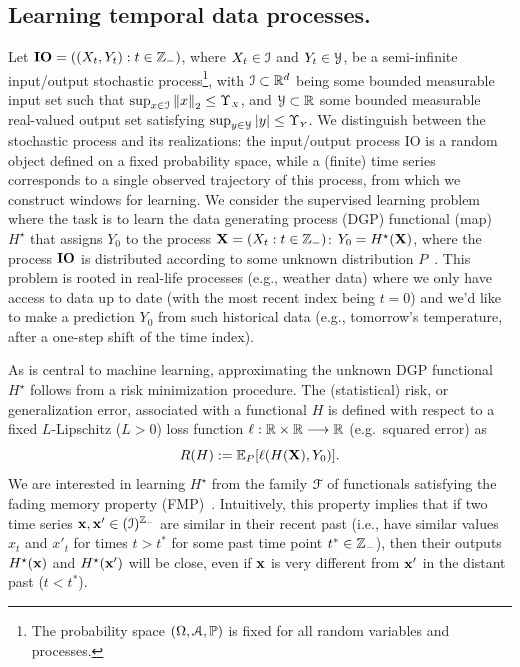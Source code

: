 \subsection{Learning temporal data processes.}\label{subsec:learning-temporal-data}
Let 
$\mathbf{IO} = \left((X_t, Y_t): t \in {\mathbb{Z}}_-\right)$, where $ X_t \in {\mathcal{I}}$ and $Y_t \in {\mathcal{Y}}$, be a semi-infinite input/output stochastic process\footnote{The probability space $(\Omega, {\mathcal{A}}, {\mathbb{P}})$ is fixed for all random variables and processes.}, with ${\mathcal{I}} \subset {\mathbb{R}}^{d}$ being some bounded measurable input set such that $\sup_{x \in {\mathcal{I}}}\left\lVert x\right\rVert_{2} \leq \Upsilon_{\scriptscriptstyle X}$, and ${\mathcal{Y}} \subset {\mathbb{R}}$ some bounded measurable real-valued output set satisfying $\sup_{y \in {\mathcal{Y}}} |y| \leq \Upsilon_{\scriptscriptstyle Y}$.
We distinguish between the stochastic process and its realizations: the input/output process $\mathrm{IO}$ is a random object defined on a fixed probability space, while a (finite) time series corresponds to a single observed trajectory of this process, from which we construct windows for learning.
We consider the supervised learning problem where the task is to learn the data generating process (DGP) functional (map) $H^\star$ that assigns $Y_0$ to the process ${\mathbf{X}} = (X_t : t \in {\mathbb{Z}}_-)$: $Y_0 = H^\star({\mathbf{X}})$, where the process $\mathbf{IO}$ is distributed according to some unknown distribution $P$~\cite{Gonon_Grigoryeva_Ortega_2020, qrc_risk_bounds_2025}. This problem is rooted in real-life processes (e.g., weather data) where we only have access to data up to date (with the most recent index being $t=0$) and we'd like to make a prediction $Y_0$ from such historical data (e.g., tomorrow's temperature, after a one-step shift of the time index).

As is central to machine learning, approximating the unknown DGP functional $H^\star$ follows from a risk minimization procedure. The (statistical) risk, or generalization error, associated with a functional $H$ is defined with respect to a fixed $L$-Lipschitz ($L > 0$) loss function $\ell: {\mathbb{R}} \times {\mathbb{R}} \longrightarrow {\mathbb{R}}$ (e.g.\ squared error) as
\begin{equation}\label{eq:risk-def}
    R(H) := \mathbb{E}_P[\ell(H({\mathbf{X}}), Y_0)].
\end{equation}
We are interested in learning $H^\star$ from the family ${\mathcal{F}}$ of functionals satisfying the fading memory property (FMP)~\cite{Monzani_Prati_2025}. Intuitively, this property implies that if two time series ${\mathbf{x}}, {\mathbf{x}}' \in ({\mathcal{I}})^{{\mathbb{Z}}_-}$ are similar in their recent past (i.e., have similar values $x_t$ and $x'_t$ for times $t > t^\ast$ for some past time point $t^\ast \in {\mathbb{Z}}_-$), then their outputs $H^\star({\mathbf{x}})$ and $H^\star({\mathbf{x}}')$ will be close, even if ${\mathbf{x}}$ is very different from ${\mathbf{x}}'$ in the distant past ($t < t^\ast$).


